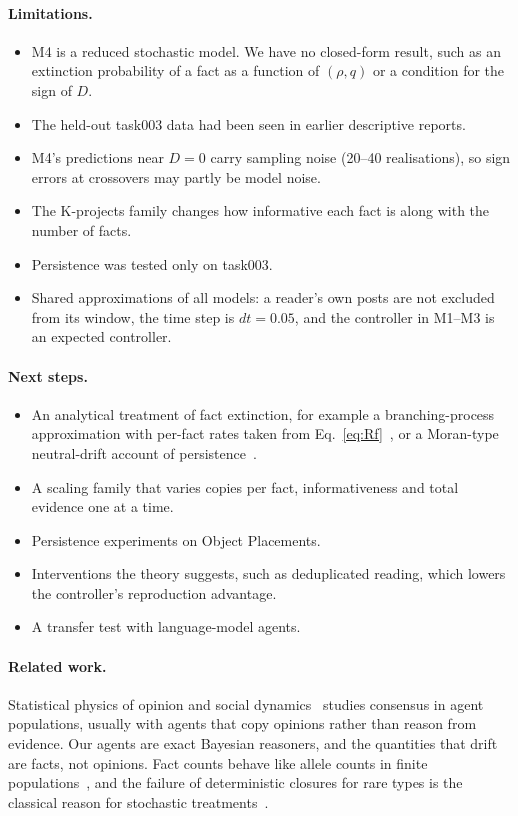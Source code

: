 \documentclass[10pt,a4paper]{article}
\begin{document}
\paragraph{Limitations.}
\begin{itemize}
\item M4 is a reduced stochastic model. We have no closed-form result, such as an extinction probability of a fact as a
  function of $(\rho,q)$ or a condition for the sign of $D$.
\item The held-out task003 data had been seen in earlier descriptive reports.
\item M4's predictions near $D=0$ carry sampling noise (20--40 realisations), so sign errors at crossovers may partly be
  model noise.
\item The K-projects family changes how informative each fact is along with the number of facts.
\item Persistence was tested only on task003.
\item Shared approximations of all models: a reader's own posts are not excluded from its window, the time step is
  $dt=0.05$, and the controller in M1--M3 is an expected controller.
\end{itemize}

\paragraph{Next steps.}
\begin{itemize}
\item An analytical treatment of fact extinction, for example a branching-process approximation with per-fact rates
  taken from Eq.~\eqref{eq:Rf}~\cite{harris1963}, or a Moran-type neutral-drift account of
  persistence~\cite{moran1958,ewens2004}.
\item A scaling family that varies copies per fact, informativeness and total evidence one at a time.
\item Persistence experiments on Object Placements.
\item Interventions the theory suggests, such as deduplicated reading, which lowers the controller's reproduction
  advantage.
\item A transfer test with language-model agents.
\end{itemize}

\paragraph{Related work.} Statistical physics of opinion and social dynamics~\cite{castellano2009} studies consensus
in agent populations, usually with agents that copy opinions rather than reason from evidence. Our agents are exact
Bayesian reasoners, and the quantities that drift are facts, not opinions. Fact counts behave like allele counts in
finite populations~\cite{moran1958,ewens2004}, and the failure of deterministic closures for rare types is the classical
reason for stochastic treatments~\cite{vankampen1992}.
\end{document}

